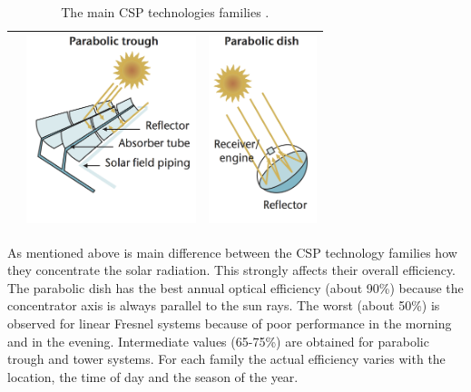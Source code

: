 \begin{table}[h!]
\begin{tabular}{  m{5cm}  m{5cm}  m{5cm}  }
    &
    \begin{minipage}{5cm}
      \centering
	  \includegraphics[height=55mm]{FIG/SUM/PT}
    \end{minipage}
    & 
    \begin{minipage}{5cm}
      \centering
	  \includegraphics[height=55mm]{FIG/SUM/PD}
    \end{minipage}    
    \\ \hline
  \end{tabular}
  \caption[The main CSP technologies families.]{The main CSP technologies families \cite{IEA2014b}.}\label{tbl: CSPtech}
\end{table}


As mentioned above is main difference between the CSP technology families how they concentrate the solar radiation. This strongly affects their overall efficiency. The parabolic dish has the best annual optical efficiency (about 90\%) because the concentrator axis is always parallel to the sun rays. The worst (about 50\%) is observed for linear Fresnel systems because of poor performance in the morning and in the evening. Intermediate values (65-75\%) are obtained for parabolic trough and tower systems. For each family the actual efficiency varies with the location, the time of day and the season of the year. \cite{EASAC2011} 



